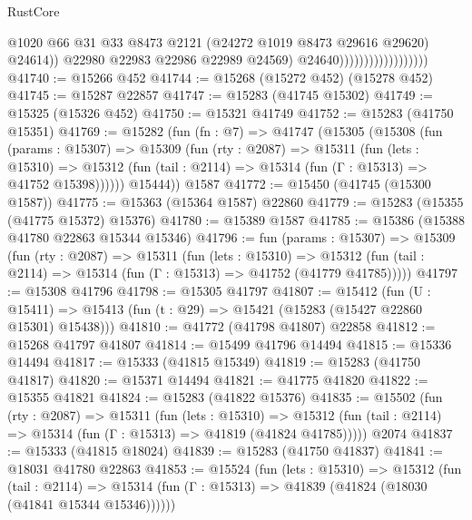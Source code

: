 \begin{lexlean}{RustCore}
\begin{coremodule}
                                              @1020
                                              @66
                                              @31
                                              @33
                                              @8473
                                              @2121
                                              (@24272 @1019 @8473 @29616 @29620)
                                              @24614))
                                          @22980
                                          @22983
                                          @22986
                                          @22989
                                          @24569)
                                        @24640))))))))))))))))))
@41740 := @15266 @452
@41744 := @15268 (@15272 @452) (@15278 @452)
@41745 := @15287 @22857
@41747 := @15283 (@41745 @15302)
@41749 := @15325 (@15326 @452)
@41750 := @15321 @41749
@41752 := @15283 (@41750 @15351)
@41769 := @15282
    (fun (fn : @7) =>
    @41747
      (@15305
        (@15308
          (fun (params : @15307) =>
          @15309
            (fun (rty : @2087) =>
            @15311
              (fun (lets : @15310) =>
              @15312 (fun (tail : @2114) => @15314 (fun (Γ : @15313) => @41752 @15398))))))
        @15444))
    @1587
@41772 := @15450 (@41745 (@15300 @1587))
@41775 := @15363 (@15364 @1587) @22860
@41779 := @15283 (@15355 (@41775 @15372) @15376)
@41780 := @15389 @1587
@41785 := @15386 (@15388 @41780 @22863 @15344 @15346)
@41796 := fun (params : @15307) =>
  @15309
    (fun (rty : @2087) =>
    @15311
      (fun (lets : @15310) =>
      @15312 (fun (tail : @2114) => @15314 (fun (Γ : @15313) => @41752 (@41779 @41785)))))
@41797 := @15308 @41796
@41798 := @15305 @41797
@41807 := @15412
    (fun (U : @15411) => @15413 (fun (t : @29) => @15421 (@15283 (@15427 @22860 @15301) @15438)))
@41810 := @41772 (@41798 @41807) @22858
@41812 := @15268 @41797 @41807
@41814 := @15499 @41796 @14494
@41815 := @15336 @14494
@41817 := @15333 (@41815 @15349)
@41819 := @15283 (@41750 @41817)
@41820 := @15371 @14494
@41821 := @41775 @41820
@41822 := @15355 @41821
@41824 := @15283 (@41822 @15376)
@41835 := @15502
    (fun (rty : @2087) =>
    @15311
      (fun (lets : @15310) =>
      @15312 (fun (tail : @2114) => @15314 (fun (Γ : @15313) => @41819 (@41824 @41785)))))
    @2074
@41837 := @15333 (@41815 @18024)
@41839 := @15283 (@41750 @41837)
@41841 := @18031 @41780 @22863
@41853 := @15524
    (fun (lets : @15310) =>
    @15312
      (fun (tail : @2114) =>
      @15314 (fun (Γ : @15313) => @41839 (@41824 (@18030 (@41841 @15344 @15346))))))

\end{coremodule}
\end{lexlean}
